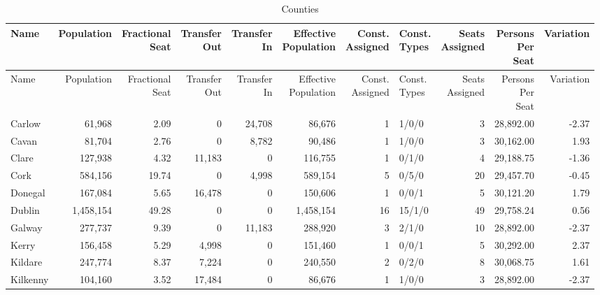 \documentclass[a4paper]{article}
\begin{document}
\begin{longtable}{lrrrrrrlrrr}
\caption{Counties}
\\ \toprule
Name &Population &\shortstack{Fractional\\Seat} &\shortstack{Transfer\\Out} &\shortstack{Transfer\\In} &\shortstack{Effective\\Population} &\shortstack{Const.\\Assigned} &\shortstack{Const.\\Types} &\shortstack{Seats\\Assigned} &\shortstack{Persons\\Per\\Seat} &Variation \\ \midrule
\endfirsthead
\toprule
Name &Population &\shortstack{Fractional\\Seat} &\shortstack{Transfer\\Out} &\shortstack{Transfer\\In} &\shortstack{Effective\\Population} &\shortstack{Const.\\Assigned} &\shortstack{Const.\\Types} &\shortstack{Seats\\Assigned} &\shortstack{Persons\\Per\\Seat} &Variation \\ \midrule
\endhead
\bottomrule
\endfoot
Carlow&61,968& 2.09&0&24,708&86,676&1&1/0/0&3&28,892.00&-2.37\\ 
Cavan&81,704& 2.76&0&8,782&90,486&1&1/0/0&3&30,162.00& 1.93\\ 
Clare&127,938& 4.32&11,183&0&116,755&1&0/1/0&4&29,188.75&-1.36\\ 
Cork&584,156&19.74&0&4,998&589,154&5&0/5/0&20&29,457.70&-0.45\\ 
Donegal&167,084& 5.65&16,478&0&150,606&1&0/0/1&5&30,121.20& 1.79\\ 
Dublin&1,458,154&49.28&0&0&1,458,154&16&15/1/0&49&29,758.24& 0.56\\ 
Galway&277,737& 9.39&0&11,183&288,920&3&2/1/0&10&28,892.00&-2.37\\ 
Kerry&156,458& 5.29&4,998&0&151,460&1&0/0/1&5&30,292.00& 2.37\\ 
Kildare&247,774& 8.37&7,224&0&240,550&2&0/2/0&8&30,068.75& 1.61\\ 
Kilkenny&104,160& 3.52&17,484&0&86,676&1&1/0/0&3&28,892.00&-2.37\\ 

\end{longtable}
\end{document}
